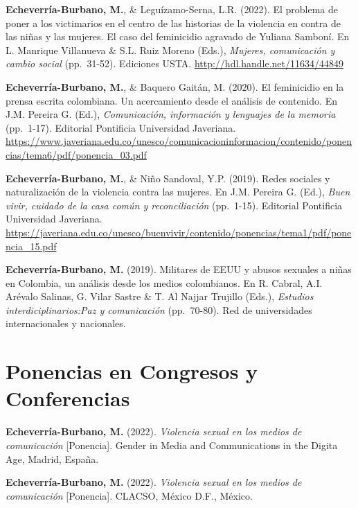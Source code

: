 \documentclass[11pt,a4paper,]{awesome-cv}
\begin{document}
\textbf{Echeverría-Burbano, M.}, \& Leguízamo-Serna, L.R. (2022). El
problema de poner a los victimarios en el centro de las historias de la
violencia en contra de las niñas y las mujeres. El caso del feminicidio
agravado de Yuliana Samboní. En L. Manrique Villanueva \& S.L. Ruiz
Moreno (Eds.), \emph{Mujeres, comunicación y cambio social} (pp.~31-52).
Ediciones USTA. \url{http://hdl.handle.net/11634/44849}

\textbf{Echeverría-Burbano, M.}, \& Baquero Gaitán, M. (2020). El
feminicidio en la prensa escrita colombiana. Un acercamiento desde el
análisis de contenido. En J.M. Pereira G. (Ed.), \emph{Comunicación,
información y lenguajes de la memoria} (pp.~1-17). Editorial Pontificia
Universidad Javeriana.
\url{https://www.javeriana.edu.co/unesco/comunicacioninformacion/contenido/ponencias/tema6/pdf/ponencia_03.pdf}

\textbf{Echeverría-Burbano, M.}, \& Niño Sandoval, Y.P. (2019). Redes
sociales y naturalización de la violencia contra las mujeres. En J.M.
Pereira G. (Ed.), \emph{Buen vivir, cuidado de la casa común y
reconciliación} (pp.~1-15). Editorial Pontificia Universidad Javeriana.
\url{https://javeriana.edu.co/unesco/buenvivir/contenido/ponencias/tema1/pdf/ponencia_15.pdf}

\textbf{Echeverría-Burbano, M.} (2019). Militares de EEUU y abusos
sexuales a niñas en Colombia, un análisis desde los medios colombianos.
En R. Cabral, A.I. Arévalo Salinas, G. Vilar Sastre \& T. Al Najjar
Trujillo (Eds.), \emph{Estudios interdiciplinarios:Paz y comunicación}
(pp.~70-80). Red de universidades internacionales y nacionales.

\endgroup

\hypertarget{ponencias-en-congresos-y-conferencias}{%
\section{Ponencias en Congresos y
Conferencias}\label{ponencias-en-congresos-y-conferencias}}

\begingroup
\setlength{\parindent}{-0.5in}
\setlength{\leftskip}{0.5in}

\textbf{Echeverría-Burbano, M.} (2022). \emph{Violencia sexual en los
medios de comunicación} {[}Ponencia{]}. Gender in Media and
Communications in the Digita Age, Madrid, España.

\textbf{Echeverría-Burbano, M.} (2022). \emph{Violencia sexual en los
medios de comunicación} {[}Ponencia{]}. CLACSO, México D.F., México.
\end{document}
